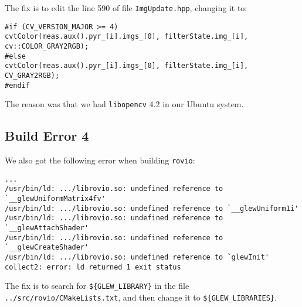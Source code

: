 \documentclass[11pt, oneside]{article}   	%
\begin{document}
The fix is to edit the line 590 of file \verb+ImgUpdate.hpp+, changing
it to:
\begin{verbatim}
#if (CV_VERSION_MAJOR >= 4)
cvtColor(meas.aux().pyr_[i].imgs_[0], filterState.img_[i], cv::COLOR_GRAY2RGB);
#else
cvtColor(meas.aux().pyr_[i].imgs_[0], filterState.img_[i], CV_GRAY2RGB);
#endif
\end{verbatim}
The reason was that we had \verb+libopencv+ 4.2 in our Ubuntu system.


\subsection{Build Error 4}
We also got the following error when building \verb+rovio+:
\begin{verbatim}
...
/usr/bin/ld: .../librovio.so: undefined reference to `__glewUniformMatrix4fv'
/usr/bin/ld: .../librovio.so: undefined reference to `__glewUniform1i'
/usr/bin/ld: .../librovio.so: undefined reference to `__glewAttachShader'
/usr/bin/ld: .../librovio.so: undefined reference to `__glewCreateShader'
/usr/bin/ld: .../librovio.so: undefined reference to `glewInit'
collect2: error: ld returned 1 exit status
\end{verbatim}

The fix is to search for  \verb+${GLEW_LIBRARY}+  in the file
\verb+../src/rovio/CMakeLists.txt+, and then change it to
\verb+${GLEW_LIBRARIES}+.
\end{document}
